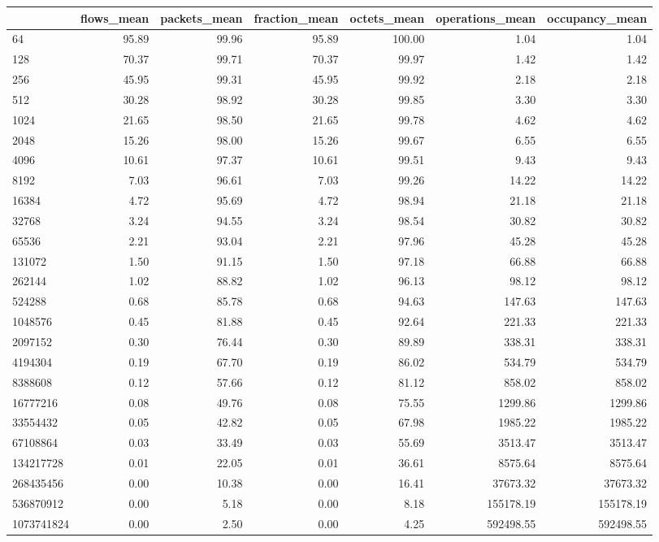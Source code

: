 \begin{tabular}{lrrrrrr}
\toprule
 & flows_mean & packets_mean & fraction_mean & octets_mean & operations_mean & occupancy_mean \\
\midrule
64 & 95.89 & 99.96 & 95.89 & 100.00 & 1.04 & 1.04 \\
128 & 70.37 & 99.71 & 70.37 & 99.97 & 1.42 & 1.42 \\
256 & 45.95 & 99.31 & 45.95 & 99.92 & 2.18 & 2.18 \\
512 & 30.28 & 98.92 & 30.28 & 99.85 & 3.30 & 3.30 \\
1024 & 21.65 & 98.50 & 21.65 & 99.78 & 4.62 & 4.62 \\
2048 & 15.26 & 98.00 & 15.26 & 99.67 & 6.55 & 6.55 \\
4096 & 10.61 & 97.37 & 10.61 & 99.51 & 9.43 & 9.43 \\
8192 & 7.03 & 96.61 & 7.03 & 99.26 & 14.22 & 14.22 \\
16384 & 4.72 & 95.69 & 4.72 & 98.94 & 21.18 & 21.18 \\
32768 & 3.24 & 94.55 & 3.24 & 98.54 & 30.82 & 30.82 \\
65536 & 2.21 & 93.04 & 2.21 & 97.96 & 45.28 & 45.28 \\
131072 & 1.50 & 91.15 & 1.50 & 97.18 & 66.88 & 66.88 \\
262144 & 1.02 & 88.82 & 1.02 & 96.13 & 98.12 & 98.12 \\
524288 & 0.68 & 85.78 & 0.68 & 94.63 & 147.63 & 147.63 \\
1048576 & 0.45 & 81.88 & 0.45 & 92.64 & 221.33 & 221.33 \\
2097152 & 0.30 & 76.44 & 0.30 & 89.89 & 338.31 & 338.31 \\
4194304 & 0.19 & 67.70 & 0.19 & 86.02 & 534.79 & 534.79 \\
8388608 & 0.12 & 57.66 & 0.12 & 81.12 & 858.02 & 858.02 \\
16777216 & 0.08 & 49.76 & 0.08 & 75.55 & 1299.86 & 1299.86 \\
33554432 & 0.05 & 42.82 & 0.05 & 67.98 & 1985.22 & 1985.22 \\
67108864 & 0.03 & 33.49 & 0.03 & 55.69 & 3513.47 & 3513.47 \\
134217728 & 0.01 & 22.05 & 0.01 & 36.61 & 8575.64 & 8575.64 \\
268435456 & 0.00 & 10.38 & 0.00 & 16.41 & 37673.32 & 37673.32 \\
536870912 & 0.00 & 5.18 & 0.00 & 8.18 & 155178.19 & 155178.19 \\
1073741824 & 0.00 & 2.50 & 0.00 & 4.25 & 592498.55 & 592498.55 \\
\bottomrule
\end{tabular}
